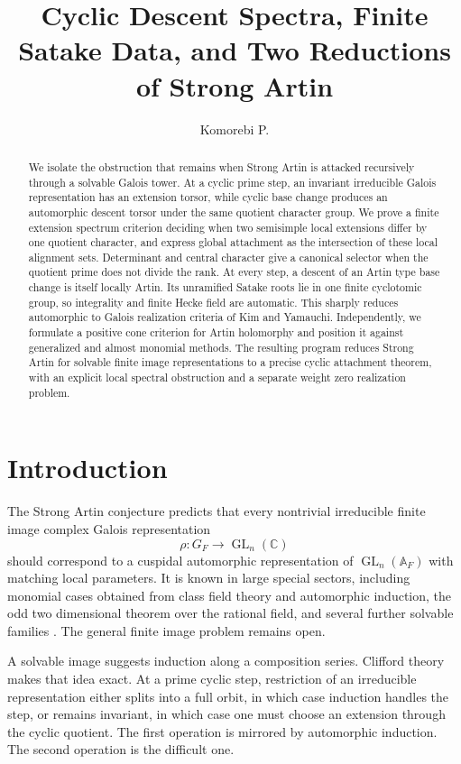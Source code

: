 \documentclass{aomart}
\title[Cyclic descent and Strong Artin]{Cyclic Descent Spectra, Finite Satake Data, and Two Reductions of Strong Artin}
\author[Komorebi P.]{Komorebi P.}
\theoremstyle{definition}
\theoremstyle{remark}
\newcommand{\CC}{\mathbb C}
\newcommand{\Adele}{\mathbb A}
\newcommand{\GL}{\operatorname{GL}}
\begin{document}
\begin{abstract}
We isolate the obstruction that remains when Strong Artin is attacked recursively through a solvable Galois tower. At a cyclic prime step, an invariant irreducible Galois representation has an extension torsor, while cyclic base change produces an automorphic descent torsor under the same quotient character group. We prove a finite extension spectrum criterion deciding when two semisimple local extensions differ by one quotient character, and express global attachment as the intersection of these local alignment sets. Determinant and central character give a canonical selector when the quotient prime does not divide the rank. At every step, a descent of an Artin type base change is itself locally Artin. Its unramified Satake roots lie in one finite cyclotomic group, so integrality and finite Hecke field are automatic. This sharply reduces automorphic to Galois realization criteria of Kim and Yamauchi. Independently, we formulate a positive cone criterion for Artin holomorphy and position it against generalized and almost monomial methods. The resulting program reduces Strong Artin for solvable finite image representations to a precise cyclic attachment theorem, with an explicit local spectral obstruction and a separate weight zero realization problem.
\end{abstract}
\maketitle
\thispagestyle{plain}

\section{Introduction}\label{sec:introduction}

The Strong Artin conjecture predicts that every nontrivial irreducible finite image complex Galois representation
\[
 \rho:G_F\longrightarrow\GL_n(\CC)
\]
should correspond to a cuspidal automorphic representation of \(\GL_n(\Adele_F)\) with matching local parameters. It is known in large special sectors, including monomial cases obtained from class field theory and automorphic induction, the odd two dimensional theorem over the rational field, and several further solvable families \cite{Langlands1980,Tunnell1981,ArthurClozel1989,Ramakrishnan2002}. The general finite image problem remains open.

A solvable image suggests induction along a composition series. Clifford theory makes that idea exact. At a prime cyclic step, restriction of an irreducible representation either splits into a full orbit, in which case induction handles the step, or remains invariant, in which case one must choose an extension through the cyclic quotient. The first operation is mirrored by automorphic induction. The second operation is the difficult one.
\end{document}
